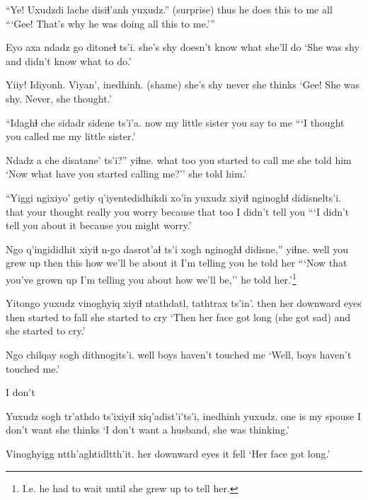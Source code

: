 \documentclass[12pt]{article}
\begin{document}
\gll ``Ye! Uxudzdi lache disiɬ'anh          yuxudz.''
(surprise) thus  {} {he does this to me} all
\glt ```Gee! That's why he was doing all this to me.'''
\glend

\gll Eyo axa   {ndadz go}   ditoneɬ ts'i.
she's shy {doesn't know what}  {she'll do }
\glt `She was shy and didn't know what to do.'
\glend

\gll Yiiy!   Idiyonh.   Viyan', inedhinh.
(shame) {she's shy} never  {she thinks}
\glt `Gee! She was shy. Never, she thought.'
\glend

\gll ``{Idaghɬ che} sidadr sidene ts'i'a. 
now       {my little sister} {you say to me}
\glt ```I thought you called me my little sister.'
\glend

\gll Ndadz a che   disatane'              ts'i?'' yiɬne.
what {}   too {you started to call me} {} {she told him}
\glt `Now what have you started calling me?'' she told him.'
\glend

\gll ``Yiggi ngixiyo'     getiy  q'iyentedidhikdi xo'in yuxudz xiyiɬ {nginoghɬ didisnelts'i}.
that  {your thought} really {you worry}   because that   too   {I didn't tell you  }
\glt ```I didn't tell you about it because you might worry.'
\glend

\gll Ngo  q'ingididhit xiyiɬ n-go   dasrot'aɬ    ts'i  xogh    {nginoghɬ didisne},'' yiɬne.
well {you grew up}  then    this {how we'll be} {} {about it} {I'm telling you}  {he told her}
\glt ```Now that you've grown up I'm telling you about how we'll be,'' he told her.'\footnote{I.e. he had to wait until she grew up to tell her.}
\glend

\gll Yitongo yuxudz vinoghyiq  xiyiɬ       ntathdatl,       tathtrax ts'in'.
then     {}    {her downward eyes} then {started to fall} {she started to cry}
\glt `Then her face got long (she got sad) and she started to cry.'
\glend

\gll Ngo  chilqay {sogh dithnogits'i.}
well boys    {haven't touched me}
\glt `Well, boys haven't touched me.'
\glend

I don't 

\gll Yuxudz {sogh tr'athdo}   ts'ixiyiɬ {xiq'adist'i'ts'i,} inedhinh yuxudz.
{}    {one is my spouse} {}      {I don't want}      {she thinks}
\glt `I don't want a husband, she was thinking.'
\glend

\gll Vinoghyigg         ntth'aghtidltth'it.
{her downward eyes} {it fell}
\glt `Her face got long.'
\glend
\end{document}
